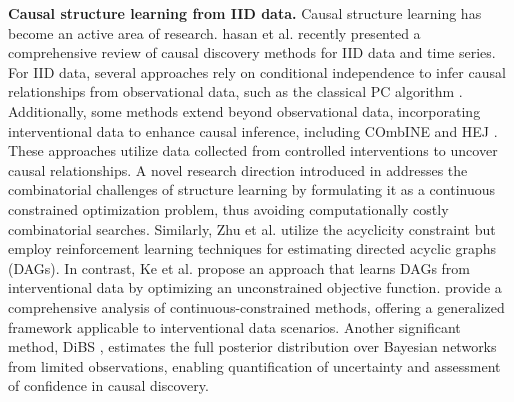 \textbf{Causal structure learning from IID data. }Causal structure learning has become an active area of research. hasan et al. \citep{hasan2023survey} recently presented a comprehensive review of causal discovery methods for IID data and time series. For IID data, several approaches rely on conditional independence to infer causal relationships from observational data, such as the classical PC algorithm \citep{spirtes2000causation}. Additionally, some methods extend beyond observational data, incorporating interventional data to enhance causal inference, including COmbINE \citep{triantafillou2015constraint} and HEJ \citep{hyttinen2014constraint}. These approaches utilize data collected from controlled interventions to uncover causal relationships. A novel research direction introduced in \citep{zheng2018dags} addresses the combinatorial challenges of structure learning by formulating it as a continuous constrained optimization problem, thus avoiding computationally costly combinatorial searches. Similarly, Zhu et al. \citep{zhu2019causal} utilize the acyclicity constraint but employ reinforcement learning techniques for estimating directed acyclic graphs (DAGs). In contrast, Ke et al. \citep{ke2019learning} propose an approach that learns DAGs from interventional data by optimizing an unconstrained objective function. \citep{brouillard2020differentiable} provide a comprehensive analysis of continuous-constrained methods, offering a generalized framework applicable to interventional data scenarios. Another significant method, DiBS \citep{lorch2021dibs}, estimates the full posterior distribution over Bayesian networks from limited observations, enabling quantification of uncertainty and assessment of confidence in causal discovery.

